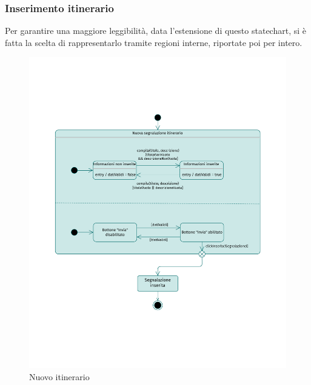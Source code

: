 \documentclass{natourDoc}
\begin{document}
\subsubsection{Inserimento itinerario}
Per garantire una maggiore leggibilità, data l'estensione di questo statechart,
si è fatta la scelta di rappresentarlo tramite regioni interne, riportate poi per intero.
\begin{figure}[!htbp]
	\centering
	\includegraphics[width=\textwidth, page=2]{./diagrams/statechart.pdf}
	\caption{Nuovo itinerario}
\end{figure}
\FloatBarrier
\end{document}
